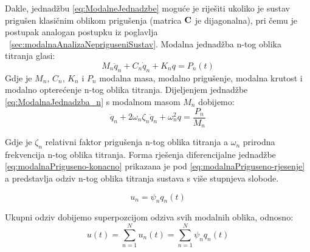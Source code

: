Dakle, jednadžbu \eqref{eq:ModalneJednadzbe} moguće je riješiti ukoliko je sustav
prigušen klasičnim oblikom prigušenja (matrica $\mathbf{C}$ je dijagonalna), pri čemu je
postupak analogan postupku iz poglavlja ~\ref{sec:modalnaAnalizaNepriguseniSustav}. Modalna
jednadžba n-tog oblika titranja glasi:
\begin{equation}\label{eq:ModalnaJednadzba_n}
    M_n\ddot{q}_n + C_n\dot{q}_n  + K_nq = P_n(t)
\end{equation}
Gdje je $M_n$, $C_n$, $K_n$ i $P_n$ modalna masa, modalno prigušenje, modalna
krutost i modalno opterećenje n-tog oblika titranja.
Dijeljenjem jednadžbe \eqref{eq:ModalnaJednadzba_n} s modalnom masom $M_n$ dobijemo:
\begin{equation}\label{eq:modalnaPriguseno-konacno}
    \ddot{q}_n + 2\omega_n\zeta_n\ddot{q}_n + \omega_n^2q = \frac{P_n}{M_n}
\end{equation}

Gdje je $\zeta_n$ relativni faktor prigušenja n-tog oblika titranja a $\omega_n$
prirodna frekvencija n-tog oblika titranja. Forma rješenja diferencijalne jednadžbe 
\eqref{eq:modalnaPriguseno-konacno} prikazana je pod \eqref{eq:modalnaPriguseno-rjesenje} 
a predstavlja odziv n-tog oblika titranja sustava s više stupnjeva slobode. 

\begin{equation}\label{eq:modalnaPriguseno-rjesenje}
    u_n = \psi_n q_n(t)
\end{equation}

Ukupni odziv dobijemo superpozcijom odziva svih modalnih oblika, odnosno:
\begin{equation} 
    u(t) = \sum_{n=1}^Nu_n(t) = \sum_{n=1}^N\psi_nq_n(t)
\end{equation}
